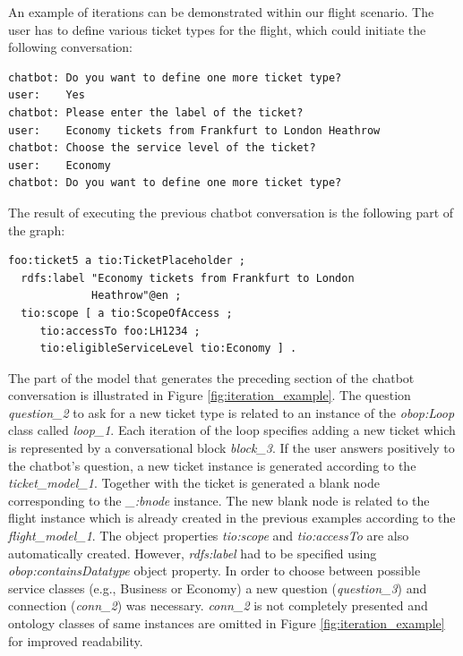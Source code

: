 \documentclass[runningheads]{llncs}
\begin{document}
An example of iterations can be demonstrated within our flight scenario. The user has to define various ticket types for the flight, which could initiate the following conversation:
\begin{lstlisting}[basicstyle=\small,  xleftmargin=0.7cm ]
chatbot: Do you want to define one more ticket type?
user:    Yes
chatbot: Please enter the label of the ticket?
user:    Economy tickets from Frankfurt to London Heathrow
chatbot: Choose the service level of the ticket?
user:    Economy
chatbot: Do you want to define one more ticket type?
\end{lstlisting}
The result of executing the previous chatbot conversation is the following part of the graph:
\begin{lstlisting}[basicstyle=\small,  xleftmargin=0.7cm ]
foo:ticket5 a tio:TicketPlaceholder ;
  rdfs:label "Economy tickets from Frankfurt to London
             Heathrow"@en ;
  tio:scope [ a tio:ScopeOfAccess ;
     tio:accessTo foo:LH1234 ;
     tio:eligibleServiceLevel tio:Economy ] .
\end{lstlisting}
The part of the model that generates the preceding section of the chatbot conversation is illustrated in Figure \ref{fig:iteration_example}. The question \textit{question\_2} to ask for a new ticket type is related to an instance of the \textit{obop:Loop} class called \textit{loop\_1}. Each iteration of the loop specifies adding a new ticket which is represented by a conversational block \textit{block\_3}. If the user answers positively to the chatbot's question, a new ticket instance is generated according to the \textit{ticket\_model\_1}. Together with the ticket is generated a blank node corresponding to the \textit{\_:bnode} instance. The new blank node is related to the flight instance which is already created in the previous examples according to the \textit{flight\_model\_1}. The object properties \textit{tio:scope} and \textit{tio:accessTo} are also automatically created. However, \textit{rdfs:label} had to be specified using \textit{obop:containsDatatype} object property. In order to choose between possible service classes (e.g., Business or Economy) a new question (\textit{question\_3}) and connection (\textit{conn\_2}) was necessary. \textit{conn\_2} is not completely presented and ontology classes of same instances are omitted in Figure \ref{fig:iteration_example} for improved readability. 
\end{document}

